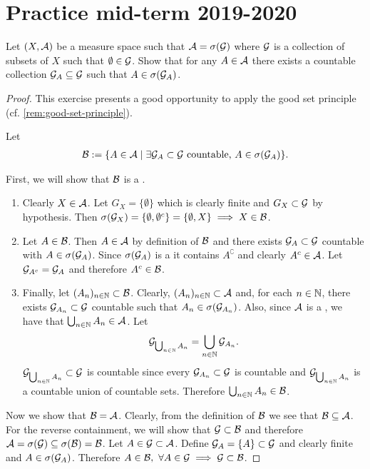 \section{Practice mid-term 2019-2020}

\begin{ex}
	Let $(X, \mathcal{A})$ be a measure space such that $\mathcal{A} = \sigma(\mathcal{G})$ where $\mathcal{G}$ is a collection of subsets of $X$ such that $\emptyset \in \mathcal{G}$. Show that for any $A \in \mathcal{A}$ there exists a countable collection $\mathcal{G}_A \subseteq \mathcal{G}$ such that $A \in \sigma(\mathcal{G}_A)$.
\end{ex}

\begin{proof}
	This exercise presents a good opportunity to apply the good set principle (cf. \autoref{rem:good-set-principle}).
	
	Let
	\begin{align*}
		\mathcal{B} := \{ A \in \mathcal{A} \mid \exists \mathcal{G}_A \subset \mathcal{G} \text{ countable, } A \in \sigma(\mathcal{G}_A)\}.
	\end{align*}
	
	First, we will show that $\mathcal{B}$ is a \siga.
	\begin{enumerate}
		\item Clearly $X \in \mathcal{A}$. Let $G_X = \{\emptyset\}$ which is clearly finite and $G_X \subset \mathcal{G}$ by hypothesis. Then $\sigma(\mathcal{G}_X) = \{\emptyset, \emptyset^c\} = \{\emptyset, X\} \implies X \in \mathcal{B}$.
		\item Let $A \in \mathcal{B}$. Then $A \in \mathcal{A}$ by definition of $\mathcal{B}$ and there exists $\mathcal{G}_A \subset \mathcal{G}$ countable with $A \in \sigma(\mathcal{G}_A)$. Since $\sigma(\mathcal{G}_A)$ is a \siga it contains $A^\complement$ and clearly $A^c \in \mathcal{A}$. Let $\mathcal{G}_{A^c} = \mathcal{G}_A$ and therefore $A^c \in \mathcal{B}$.
		\item Finally, let $(A_n)_{n\in\mathbb{N}} \subset \mathcal{B}$. Clearly, $(A_n)_{n\in\mathbb{N}} \subset \mathcal{A}$ and, for each $n \in \mathbb{N}$, there exists $\mathcal{G}_{A_n} \subset \mathcal{G}$ countable such that $A_n \in \sigma(\mathcal{G}_{A_n})$. Also, since $\mathcal{A}$ is a \siga, we have that $\bigcup_{n\in\mathbb{N}}A_n \in \mathcal{A}$. Let
		\begin{align*}
			\mathcal{G}_{\bigcup_{n\in\mathbb{N}} A_n} = \bigcup_{n\in\mathbb{N}} \mathcal{G}_{A_n}.
		\end{align*}
		$\mathcal{G}_{\bigcup_{n\in\mathbb{N}} A_n} \subset \mathcal{G}$ is countable since every $\mathcal{G}_{A_n} \subset \mathcal{G}$ is countable and $\mathcal{G}_{\bigcup_{n\in\mathbb{N}} A_n}$ is a countable union of countable sets. Therefore $\bigcup_{n\in\mathbb{N}} A_n \in \mathcal{B}$.
	\end{enumerate}

	Now we show that $\mathcal{B} = \mathcal{A}$. Clearly, from the definition of $\mathcal{B}$ we see that $\mathcal{B} \subseteq \mathcal{A}$. For the reverse containment, we will show that $\mathcal{G} \subset \mathcal{B}$ and therefore $\mathcal{A} = \sigma(\mathcal{G}) \subseteq \sigma(\mathcal{B}) = \mathcal{B}$. Let $A \in \mathcal{G} \subset \mathcal{A}$. Define $\mathcal{G}_A = \{A\} \subset \mathcal{G}$ and clearly finite and $A \in \sigma(\mathcal{G}_A)$. Therefore $A \in \mathcal{B},\ \forall A \in \mathcal{G} \implies \mathcal{G}\subset \mathcal{B}$.
\end{proof}

